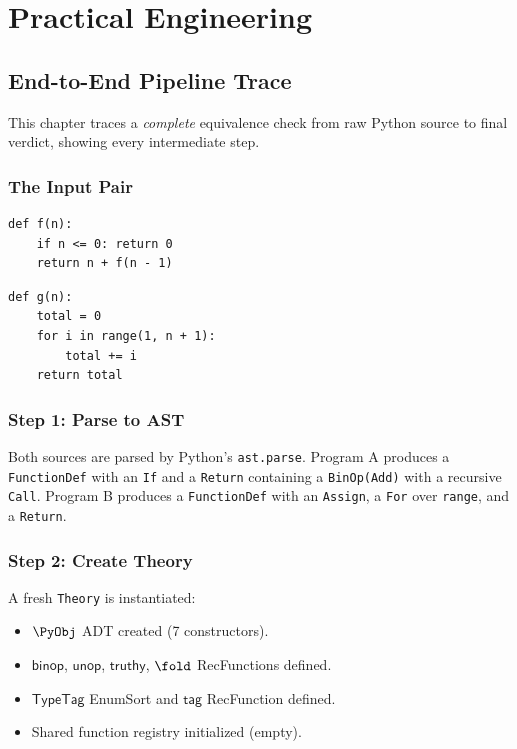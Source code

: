 \part{Practical Engineering}

\chapter{End-to-End Pipeline Trace}
\label{ch:e2e}

This chapter traces a \emph{complete} equivalence check from raw
Python source to final verdict, showing every intermediate step.

\section{The Input Pair}

\begin{lstlisting}[caption={Program A: recursive sum}]
def f(n):
    if n <= 0: return 0
    return n + f(n - 1)
\end{lstlisting}

\begin{lstlisting}[caption={Program B: iterative sum}]
def g(n):
    total = 0
    for i in range(1, n + 1):
        total += i
    return total
\end{lstlisting}

\section{Step 1: Parse to AST}

Both sources are parsed by Python's \texttt{ast.parse}.  Program A
produces a \texttt{FunctionDef} with an \texttt{If} and a
\texttt{Return} containing a \texttt{BinOp(Add)} with a recursive
\texttt{Call}.  Program B produces a \texttt{FunctionDef} with an
\texttt{Assign}, a \texttt{For} over \texttt{range}, and a
\texttt{Return}.

\section{Step 2: Create Theory}

A fresh \texttt{Theory} is instantiated:
\begin{itemize}
  \item $\PyObj$ ADT created (7 constructors).
  \item $\mathsf{binop}$, $\mathsf{unop}$, $\mathsf{truthy}$,
    $\fold$ RecFunctions defined.
  \item $\mathsf{TypeTag}$ EnumSort and $\mathsf{tag}$ RecFunction
    defined.
  \item Shared function registry initialized (empty).
\end{itemize}

